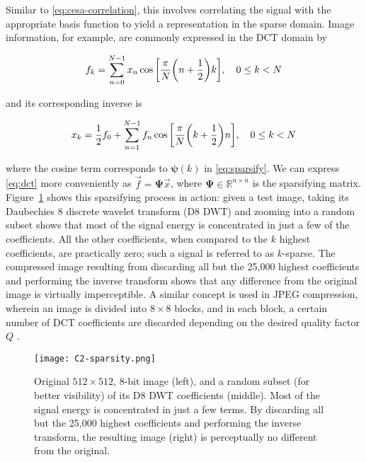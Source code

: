 Similar to \eqref{eq:cesa-correlation}, this involves correlating the signal with the appropriate basis function to yield a representation in the sparse domain. Image information, for example, are commonly expressed in the DCT domain by

\begin{equation}\label{eq:dct}
	f_k = \sum_{n=0}^{N-1} x_n \cos\qty[\frac{\pi}{N}\qty(n + \frac{1}{2})k] , \quad 0 \leq k < N
\end{equation}

\noindent and its corresponding inverse is

\begin{equation}\label{eq:idct}
	x_k = \frac{1}{2}f_0 + \sum_{n=1}^{N-1} f_n \cos\qty[\frac{\pi}{N} \qty(k + \frac{1}{2})n] , \quad 0 \leq k < N
\end{equation}

\noindent where the cosine term corresponds to $\bm\psi(k)$ in \eqref{eq:sparsify}. We can express \eqref{eq:dct} more conveniently as $\vec{f} = \bm\Psi \vec{x}$, where $\bm\Psi \in \mathbb{R}^{n \times n}$ is the sparsifying matrix. Figure~\ref{fig:sparsity} shows this sparsifying process in action: given a test image, taking its Daubechies 8 discrete wavelet transform (D8 DWT) and zooming into a random subset shows that most of the signal energy is concentrated in just a few of the coefficients. All the other coefficients, when compared to the $k$ highest coefficients, are practically zero; such a signal is referred to as $k$-sparse. The compressed image resulting from discarding all but the 25,000 highest coefficients and performing the inverse transform shows that any difference from the original image is virtually imperceptible. A similar concept is used in JPEG compression, wherein an image is divided into $8 \times 8$ blocks, and in each block, a certain number of DCT coefficients are discarded depending on the desired quality factor $Q$ \cite{itu-jpeg}.

\begin{figure}[htb]
	\texttt{[image: C2-sparsity.png]}
	\caption{Original $512 \times 512$, 8-bit image (left), and a random subset (for better visibility) of its D8 DWT coefficients (middle). Most of the signal energy is concentrated in just a few terms. By discarding all but the 25,000 highest coefficients and performing the inverse transform, the resulting image (right) is perceptually no different from the original.}
	\label{fig:sparsity}
\end{figure}


